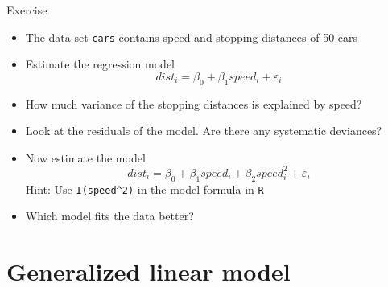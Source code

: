 \documentclass[aspectratio=169]{beamer}
\begin{document}
\begin{frame}[fragile]{}
  \begin{block}{Exercise}
    \begin{itemize}
      \item The data set \texttt{cars} contains speed and stopping
        distances of 50 cars
      \item Estimate the regression model
\[
  dist_i = \beta_0 + \beta_1 speed_i + \varepsilon_i
\]\vspace{-.8cm}
      \item How much variance of the stopping distances is explained by
      speed? \item Look at the residuals of the model. Are there any
        systematic deviances?
      \item Now estimate the model
\[
  dist_i = \beta_0 + \beta_1 speed_i + \beta_2 speed^2_i + \varepsilon_i
\]
        Hint: Use \verb+I(speed^2)+ in the model formula in \texttt{R}
      \item Which model fits the data better?
    \end{itemize}
  \end{block}
\end{frame}

\section{Generalized linear model}
\end{document}
